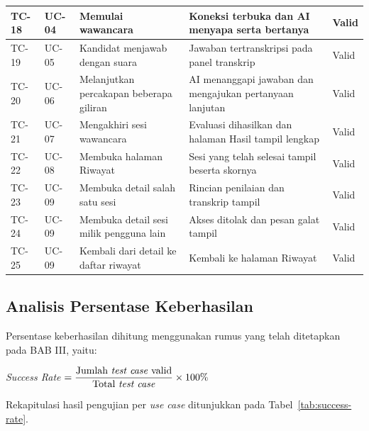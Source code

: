 \documentclass[12pt,a4paper,oneside]{report}
\begin{document}
\begin{longtable}{|C{1.1cm}|C{1.1cm}|L{4.5cm}|L{3.1cm}|C{1.3cm}|}
\hline
TC-18 & UC-04 & Memulai wawancara & Koneksi terbuka dan AI menyapa serta bertanya & Valid \\
\hline
TC-19 & UC-05 & Kandidat menjawab dengan suara & Jawaban tertranskripsi pada panel transkrip & Valid \\
\hline
TC-20 & UC-06 & Melanjutkan percakapan beberapa giliran & AI menanggapi jawaban dan mengajukan pertanyaan lanjutan & Valid \\
\hline
TC-21 & UC-07 & Mengakhiri sesi wawancara & Evaluasi dihasilkan dan halaman Hasil tampil lengkap & Valid \\
\hline
TC-22 & UC-08 & Membuka halaman Riwayat & Sesi yang telah selesai tampil beserta skornya & Valid \\
\hline
TC-23 & UC-09 & Membuka detail salah satu sesi & Rincian penilaian dan transkrip tampil & Valid \\
\hline
TC-24 & UC-09 & Membuka detail sesi milik pengguna lain & Akses ditolak dan pesan galat tampil & Valid \\
\hline
TC-25 & UC-09 & Kembali dari detail ke daftar riwayat & Kembali ke halaman Riwayat & Valid \\
\hline
\end{longtable}

\subsection{Analisis Persentase Keberhasilan}

Persentase keberhasilan dihitung menggunakan rumus yang telah ditetapkan pada
BAB III, yaitu:

\begin{center}
\textit{Success Rate} $=\dfrac{\text{Jumlah \textit{test case} valid}}{\text{Total \textit{test case}}}\times 100\%$
\end{center}

Rekapitulasi hasil pengujian per \textit{use case} ditunjukkan pada
Tabel~\ref{tab:success-rate}.
\end{document}
